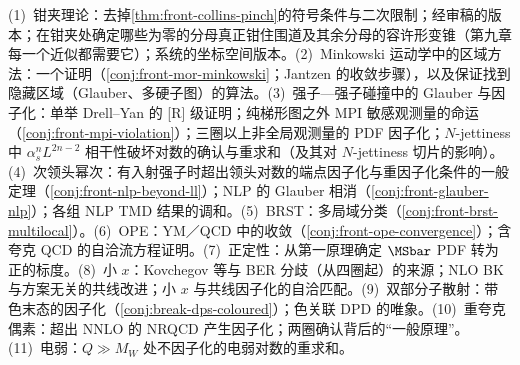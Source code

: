\begin{remark}[开放问题]\label{rem:front-open}
(1)~钳夹理论：去掉\cref{thm:front-collins-pinch}的符号条件与二次限制；经审稿的版本；在钳夹处确定哪些为零的分母真正钳住围道及其余分母的容许形变锥（第九章每一个近似都需要它）；系统的坐标空间版本。(2)~Minkowski 运动学中的区域方法：一个证明（\cref{conj:front-mor-minkowski}；Jantzen 的收敛步骤），以及保证找到隐藏区域（Glauber、多硬子图）的算法。(3)~强子—强子碰撞中的 Glauber 与因子化：单举 Drell--Yan 的 [R] 级证明；纯梯形图之外 MPI 敏感观测量的命运（\cref{conj:front-mpi-violation}）；三圈以上非全局观测量的 PDF 因子化；$N$-jettiness 中 $\alpha_s^nL^{2n-2}$ 相干性破坏对数的确认与重求和（及其对 $N$-jettiness 切片的影响）。(4)~次领头幂次：有入射强子时超出领头对数的端点因子化与重因子化条件的一般定理（\cref{conj:front-nlp-beyond-ll}）；NLP 的 Glauber 相消（\cref{conj:front-glauber-nlp}）；各组 NLP TMD 结果的调和。(5)~BRST：多局域分类（\cref{conj:front-brst-multilocal}）。(6)~OPE：YM／QCD 中的收敛（\cref{conj:front-ope-convergence}）；含夸克 QCD 的自洽流方程证明。(7)~正定性：从第一原理确定 $\MSbar$ PDF 转为正的标度。(8)~小 $x$：Kovchegov 等与 BER 分歧（从四圈起）的来源；NLO BK 与方案无关的共线改进；小 $x$ 与共线因子化的自洽匹配。(9)~双部分子散射：带色末态的因子化（\cref{conj:break-dps-coloured}）；色关联 DPD 的唯象。(10)~重夸克偶素：超出 NNLO 的 NRQCD 产生因子化；两圈确认背后的“一般原理”。(11)~电弱：$Q\gg M_W$ 处不因子化的电弱对数的重求和。
\end{remark}
